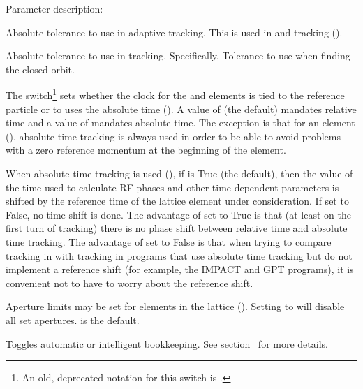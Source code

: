 {Parameter description:
\begin{description}
\item[\vn{abs_tol_adaptive_tracking}] \Newline
Absolute tolerance to use in adaptive tracking. This is used in  and
 tracking ().
%
\item[\vn{abs_tol_tracking}] \Newline
Absolute tolerance to use in tracking. Specifically, Tolerance to use when finding the closed orbit.
%
\item[\vn{absolute_time_tracking}] \Newline
The  switch\footnote
  {
An old, deprecated notation for this switch is .
  }
sets whether the clock for the  and  elements is tied to the reference
particle or to uses the absolute time (). A value of  (the default)
mandates relative time and a value of  mandates absolute time. The exception is that for an
 element (), absolute time tracking is always used in order to be able to
avoid problems with a zero reference momentum at the beginning of the element.
%
\item[\vn{absolute_time_ref_shift}] \Newline
When absolute time tracking is used (), if  is True (the
default), then the value of the time used to calculate RF phases and other time dependent parameters
is shifted by the reference time of the lattice element under consideration. If set to False, no
time shift is done. The advantage of  set to True is that (at least on
the first turn of tracking) there is no phase shift between relative time and absolute time
tracking. The advantage of  set to False is that when trying to compare
tracking in \bmad with tracking in programs that use absolute time tracking but do not implement a
reference shift (for example, the IMPACT and GPT programs), it is convenient not to have to worry
about the reference shift.
%
\item[\vn{aperture_limit_on]}] \Newline
Aperture limits may be set for elements in the lattice (). Setting
 to  will disable all set apertures.  is the default.
%
\item[\vn{auto_bookkeeper}] \Newline
Toggles automatic or intelligent bookkeeping. See
section~ for more details.
%
\item[\vn{autoscale_amp_abs_tol}] \Newline

\end{description}}
